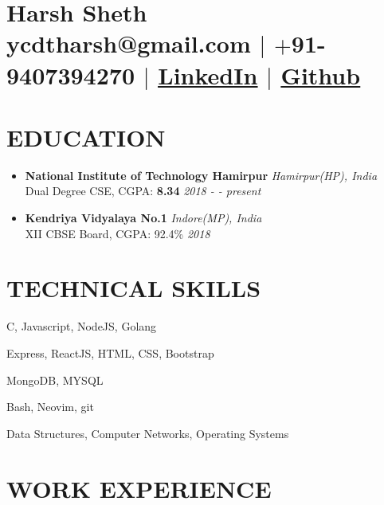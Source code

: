 \documentclass[12pt]{article}
\begin{document}
\section{\Huge{Harsh Sheth}\\ \large \normalfont ycdtharsh@gmail.com $|$ \normalfont $+$91-9407394270 $|$  \underline{\href{https://www.linkedin.com/in/harsh-sheth-2101}{LinkedIn}} $|$ \underline{\href{https://github.com/harsh-sheth}{Github}}}

\section{EDUCATION}
\begin{itemize}
  \item{
      \textbf{National Institute of Technology Hamirpur} \hfill \textit{Hamirpur(HP), India}\\
      Dual Degree CSE, CGPA: \textbf{8.34} \hfill \textit{2018 - - present}
  } 
  \item{
      \textbf{Kendriya Vidyalaya No.1} \hfill \textit{Indore(MP), India}\\
      XII CBSE Board, CGPA: 92.4\% \hfill \textit{2018}
  }
\end{itemize}

\section{TECHNICAL SKILLS}
\begin{description}
  \setlength{\itemindent}{\parindent}
  \setlength{\itemsep}{0em}
  \item[Languages:]{C, Javascript, NodeJS, Golang}
  \item[Web Technologies:]{Express, ReactJS, HTML, CSS, Bootstrap}
  \item[Databases:]{MongoDB, MYSQL}
  \item[Tools:]{Bash, Neovim, git}
  \item[Coursework:]{Data Structures, Computer Networks, Operating Systems}
\end{description}

\section{WORK EXPERIENCE}
\end{document}
